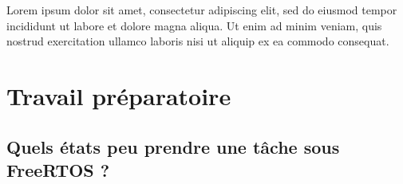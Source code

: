 \documentclass[a4paper]{report}
\begin{document}
Lorem ipsum dolor sit amet, consectetur adipiscing elit, sed do eiusmod tempor
incididunt ut labore et dolore magna aliqua. Ut enim ad minim veniam, quis
nostrud exercitation ullamco laboris nisi ut aliquip ex ea commodo consequat.


\renewcommand{\cftdot}{}
\newpage


\tableofcontents

\makeatletter
\def\@makeschapterhead#1{%
  {\parindent \z@ \raggedright
    \interlinepenalty\@M
    \normalfont\sffamily\Huge \MakeUppercase{#1}\par\vskip-14pt\nobreak
    \color{ensigray}\vspace{-0.75em}\rule{\textwidth}{2.25pt}
    \vskip 16\p@
  }}
\makeatother


\chapter*{Travail préparatoire}


\section{Quels états peu prendre une tâche sous FreeRTOS ?}
\end{document}
